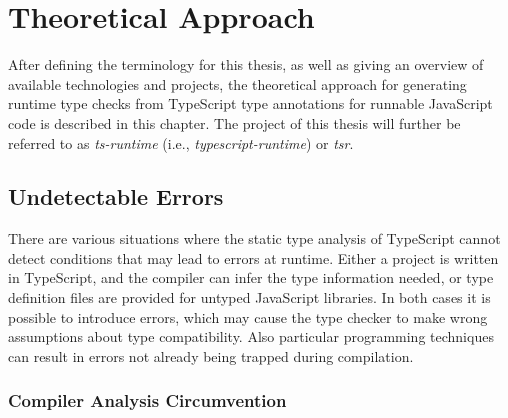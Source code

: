 \chapter{Theoretical Approach}
\label{cha:theoretical-approach}

After defining the terminology for this thesis, as well as giving an overview of available technologies and projects, the theoretical approach for generating runtime type checks from TypeScript type annotations for runnable JavaScript code is described in this chapter. The project of this thesis will further be referred to as \emph{ts-runtime} (i.e., \emph{typescript-runtime}) or \emph{tsr}.

\section{Undetectable Errors}
\label{sec:undetectable-errors}
%
%

There are various situations where the static type analysis of TypeScript cannot detect conditions that may lead to errors at runtime. Either a project is written in TypeScript, and the compiler can infer the type information needed, or type definition files are provided for untyped JavaScript libraries. In both cases it is possible to introduce errors, which may cause the type checker to make wrong assumptions about type compatibility. Also particular programming techniques can result in errors not already being trapped during compilation.

\subsection{Compiler Analysis Circumvention}

